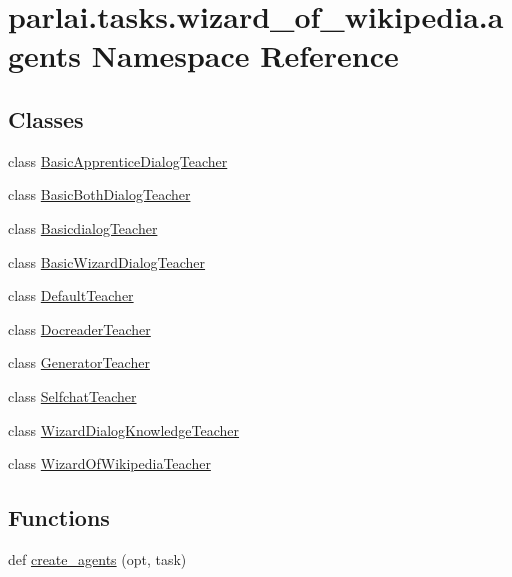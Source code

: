 \hypertarget{namespaceparlai_1_1tasks_1_1wizard__of__wikipedia_1_1agents}{}\section{parlai.\+tasks.\+wizard\+\_\+of\+\_\+wikipedia.\+agents Namespace Reference}
\label{namespaceparlai_1_1tasks_1_1wizard__of__wikipedia_1_1agents}
\subsection*{Classes}
\begin{DoxyCompactItemize}
\item 
class \hyperlink{classparlai_1_1tasks_1_1wizard__of__wikipedia_1_1agents_1_1BasicApprenticeDialogTeacher}{Basic\+Apprentice\+Dialog\+Teacher}
\item 
class \hyperlink{classparlai_1_1tasks_1_1wizard__of__wikipedia_1_1agents_1_1BasicBothDialogTeacher}{Basic\+Both\+Dialog\+Teacher}
\item 
class \hyperlink{classparlai_1_1tasks_1_1wizard__of__wikipedia_1_1agents_1_1BasicdialogTeacher}{Basicdialog\+Teacher}
\item 
class \hyperlink{classparlai_1_1tasks_1_1wizard__of__wikipedia_1_1agents_1_1BasicWizardDialogTeacher}{Basic\+Wizard\+Dialog\+Teacher}
\item 
class \hyperlink{classparlai_1_1tasks_1_1wizard__of__wikipedia_1_1agents_1_1DefaultTeacher}{Default\+Teacher}
\item 
class \hyperlink{classparlai_1_1tasks_1_1wizard__of__wikipedia_1_1agents_1_1DocreaderTeacher}{Docreader\+Teacher}
\item 
class \hyperlink{classparlai_1_1tasks_1_1wizard__of__wikipedia_1_1agents_1_1GeneratorTeacher}{Generator\+Teacher}
\item 
class \hyperlink{classparlai_1_1tasks_1_1wizard__of__wikipedia_1_1agents_1_1SelfchatTeacher}{Selfchat\+Teacher}
\item 
class \hyperlink{classparlai_1_1tasks_1_1wizard__of__wikipedia_1_1agents_1_1WizardDialogKnowledgeTeacher}{Wizard\+Dialog\+Knowledge\+Teacher}
\item 
class \hyperlink{classparlai_1_1tasks_1_1wizard__of__wikipedia_1_1agents_1_1WizardOfWikipediaTeacher}{Wizard\+Of\+Wikipedia\+Teacher}
\end{DoxyCompactItemize}
\subsection*{Functions}
\begin{DoxyCompactItemize}
\item 
def \hyperlink{namespaceparlai_1_1tasks_1_1wizard__of__wikipedia_1_1agents_a89bd55d60a50f2604b1eb59ab0e064bc}{create\+\_\+agents} (opt, task)
\end{DoxyCompactItemize}
